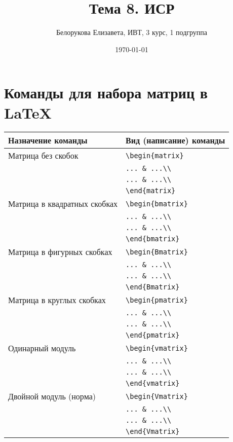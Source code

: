 \documentclass[a4paper,12pt]{article} %
\author{Белорукова Елизавета, ИВТ, 3 курс, 1 подгруппа}
\title{Тема 8. ИСР}
\date{\today}
\begin{document}
\maketitle
\newpage
\section{Команды для набора матриц в \LaTeX{}}

\begin{tabular}{| l | l |}
\hline
\textbf{Назначение команды} & \textbf{Вид (написание) команды} \\
\hline
Матрица без скобок & \verb|\begin{matrix}|\\
  & \verb|... & ...\\|\\
  & \verb|... & ...\\|\\
  & \verb|\end{matrix}|\\
Матрица в квадратных скобках & \verb|\begin{bmatrix}|\\
  & \verb|... & ...\\|\\
  & \verb|... & ...\\|\\
  & \verb|\end{bmatrix}|\\
Матрица в фигурных скобках & \verb|\begin{Bmatrix}|\\
  & \verb|... & ...\\|\\
  & \verb|... & ...\\|\\
  & \verb|\end{Bmatrix}|\\
Матрица в круглых скобках & \verb|\begin{pmatrix}|\\
  & \verb|... & ...\\|\\
  & \verb|... & ...\\|\\
  & \verb|\end{pmatrix}|\\
Одинарный модуль & \verb|\begin{vmatrix}|\\
  & \verb|... & ...\\|\\
  & \verb|... & ...\\|\\
  & \verb|\end{vmatrix}|\\
Двойной модуль (норма) & \verb|\begin{Vmatrix}|\\
  & \verb|... & ...\\|\\
  & \verb|... & ...\\|\\
  & \verb|\end{Vmatrix}|\\
\hline
\end{tabular}
\end{document}
